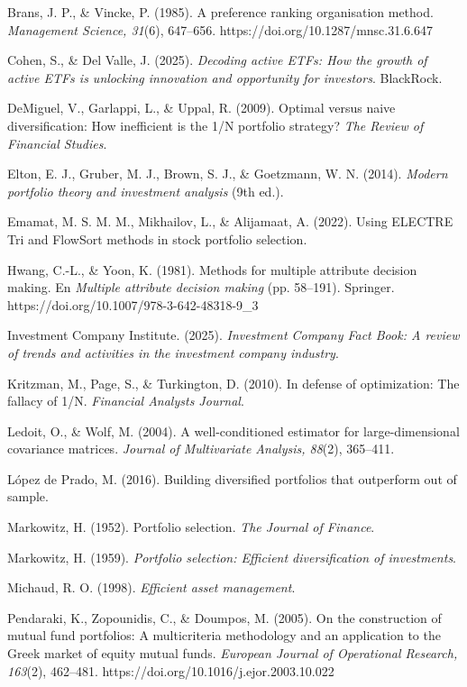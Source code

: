 \documentclass[12pt,letterpaper]{article}
\newcommand{\apa}[1]{\begingroup\sloppy\hangindent=1.25cm\hangafter=1 #1\par\vspace{0.35em}\endgroup}
\begin{document}
\apa{Brans, J. P., \& Vincke, P. (1985). A preference ranking organisation method. \textit{Management Science, 31}(6), 647--656. https://doi.org/10.1287/mnsc.31.6.647}

\apa{Cohen, S., \& Del Valle, J. (2025). \textit{Decoding active ETFs: How the growth of active ETFs is unlocking innovation and opportunity for investors}. BlackRock.}

\apa{DeMiguel, V., Garlappi, L., \& Uppal, R. (2009). Optimal versus naive diversification: How inefficient is the 1/N portfolio strategy? \textit{The Review of Financial Studies}.}

\apa{Elton, E. J., Gruber, M. J., Brown, S. J., \& Goetzmann, W. N. (2014). \textit{Modern portfolio theory and investment analysis} (9th ed.).}

\apa{Emamat, M. S. M. M., Mikhailov, L., \& Alijamaat, A. (2022). Using ELECTRE Tri and FlowSort methods in stock portfolio selection.}

\apa{Hwang, C.-L., \& Yoon, K. (1981). Methods for multiple attribute decision making. En \textit{Multiple attribute decision making} (pp. 58--191). Springer. https://doi.org/10.1007/978-3-642-48318-9\_3}

\apa{Investment Company Institute. (2025). \textit{Investment Company Fact Book: A review of trends and activities in the investment company industry}.}

\apa{Kritzman, M., Page, S., \& Turkington, D. (2010). In defense of optimization: The fallacy of 1/N. \textit{Financial Analysts Journal}.}

\apa{Ledoit, O., \& Wolf, M. (2004). A well-conditioned estimator for large-dimensional covariance matrices. \textit{Journal of Multivariate Analysis, 88}(2), 365--411.}

\apa{López de Prado, M. (2016). Building diversified portfolios that outperform out of sample.}

\apa{Markowitz, H. (1952). Portfolio selection. \textit{The Journal of Finance}.}

\apa{Markowitz, H. (1959). \textit{Portfolio selection: Efficient diversification of investments}.}

\apa{Michaud, R. O. (1998). \textit{Efficient asset management}.}

\apa{Pendaraki, K., Zopounidis, C., \& Doumpos, M. (2005). On the construction of mutual fund portfolios: A multicriteria methodology and an application to the Greek market of equity mutual funds. \textit{European Journal of Operational Research, 163}(2), 462--481. https://doi.org/10.1016/j.ejor.2003.10.022}
\end{document}
